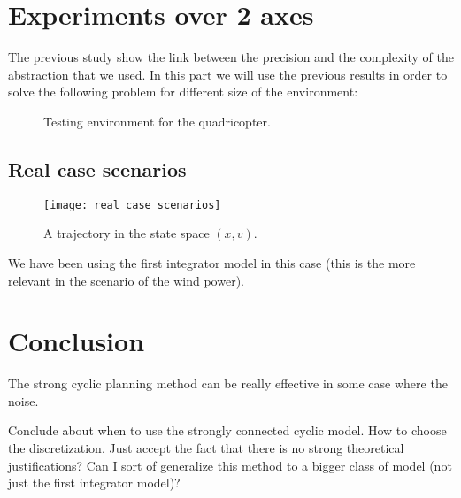 \section{Experiments over 2 axes}
The previous study show the link between the precision and the complexity of the abstraction that we used.
In this part we will use the previous results in order to solve the following problem for different size of the environment:
\begin{figure}
	\center
	
	\caption{Testing environment for the quadricopter.}
	\label{fig:environment}
\end{figure}



\subsection{Real case scenarios}

\begin{figure}[!ht]
  \centering
  \texttt{[image: real\_case\_scenarios]}
  \caption{A trajectory in the state space $(x,v)$.}
\end{figure}

We have been using the first integrator model in this case (this is the more relevant in the scenario of the wind power).

\section{Conclusion}
The strong cyclic planning method can be really effective in some case where the noise.

Conclude about when to use the strongly connected cyclic model.
How to choose the discretization.
Just accept the fact that there is no strong theoretical justifications?
Can I sort of generalize this method to a bigger class of model (not just the first integrator model)?


